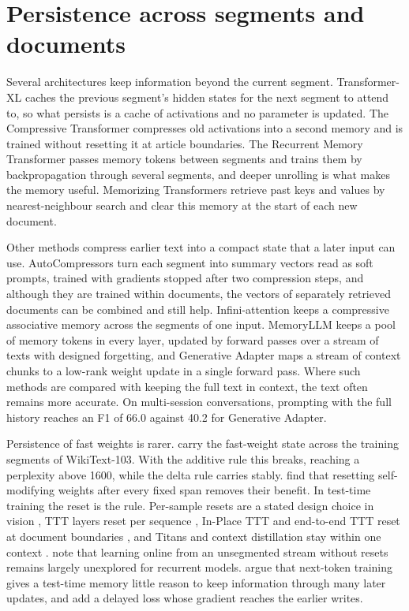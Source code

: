 \documentclass[12pt,a4paper]{report}
\begin{document}
\section{Persistence across segments and documents}
\label{sec-lit-persist}

Several architectures keep information beyond the current segment. Transformer-XL \citep{dai2019transformerxl} caches the previous segment's hidden states for the next segment to attend to, so what persists is a cache of activations and no parameter is updated. The Compressive Transformer \citep{rae2019compressive} compresses old activations into a second memory and is trained without resetting it at article boundaries. The Recurrent Memory Transformer \citep{bulatov2022rmt} passes memory tokens between segments and trains them by backpropagation through several segments, and deeper unrolling is what makes the memory useful. Memorizing Transformers \citep{wu2022memorizing} retrieve past keys and values by nearest-neighbour search and clear this memory at the start of each new document.

Other methods compress earlier text into a compact state that a later input can use. AutoCompressors \citep{chevalier2023adapting} turn each segment into summary vectors read as soft prompts, trained with gradients stopped after two compression steps, and although they are trained within documents, the vectors of separately retrieved documents can be combined and still help. Infini-attention \citep{munkhdalai2024leave} keeps a compressive associative memory across the segments of one input. MemoryLLM \citep{wang2024memoryllm} keeps a pool of memory tokens in every layer, updated by forward passes over a stream of texts with designed forgetting, and Generative Adapter \citep{chen2024generative} maps a stream of context chunks to a low-rank weight update in a single forward pass. Where such methods are compared with keeping the full text in context, the text often remains more accurate. On multi-session conversations, prompting with the full history reaches an F1 of 66.0 against 40.2 for Generative Adapter.

Persistence of fast weights is rarer. \citet{schlag2021linear} carry the fast-weight state across the training segments of WikiText-103. With the additive rule this breaks, reaching a perplexity above 1600, while the delta rule carries stably. \citet{irie2022modern} find that resetting self-modifying weights after every fixed span removes their benefit. In test-time training the reset is the rule. Per-sample resets are a stated design choice in vision \citep{sun2020ttt,gandelsman2022ttt}, TTT layers reset per sequence \citep{sun2025learning}, In-Place TTT and end-to-end TTT reset at document boundaries \citep{feng2026inplace,tandon2025endtoend}, and Titans and context distillation stay within one context \citep{behrouz2025titans,wang2026learning}. \citet{tiezzi2025state} note that learning online from an unsegmented stream without resets remains largely unexplored for recurrent models. \citet{kim2026delayed} argue that next-token training gives a test-time memory little reason to keep information through many later updates, and add a delayed loss whose gradient reaches the earlier writes.
\end{document}
